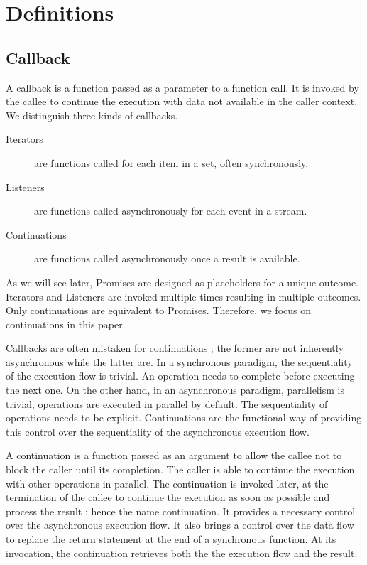 \section{Definitions} \label{section:definitions}

\subsection{Callback} \label{section:definitions:continuation}

A callback is a function passed as a parameter to a function call.
It is invoked by the callee to continue the execution with data not available in the caller context.
We distinguish three kinds of callbacks.

\begin{description}
  \item[Iterators] are functions called for each item in a set, often synchronously.
  \item[Listeners] are functions called asynchronously for each event in a stream.
  \item[Continuations] are functions called asynchronously once a result is available.
\end{description}

As we will see later, Promises are designed as placeholders for a unique outcome.
Iterators and Listeners are invoked multiple times resulting in multiple outcomes.
Only continuations are equivalent to Promises.
Therefore, we focus on continuations in this paper.

Callbacks are often mistaken for continuations ; the former are not inherently asynchronous while the latter are.
In a synchronous paradigm, the sequentiality of the execution flow is trivial.
An operation needs to complete before executing the next one.
On the other hand, in an asynchronous paradigm, parallelism is trivial, operations are executed in parallel by default.
The sequentiality of operations needs to be explicit.
Continuations are the functional way of providing this control over the sequentiality of the asynchronous execution flow.

A continuation is a function passed as an argument to allow the callee not to block the caller until its completion.
The caller is able to continue the execution with other operations in parallel.
The continuation is invoked later, at the termination of the callee to continue the execution as soon as possible and process the result ; hence the name continuation.
It provides a necessary control over the asynchronous execution flow.
It also brings a control over the data flow to replace the return statement at the end of a synchronous function.
At its invocation, the continuation retrieves both the the execution flow and the result.


